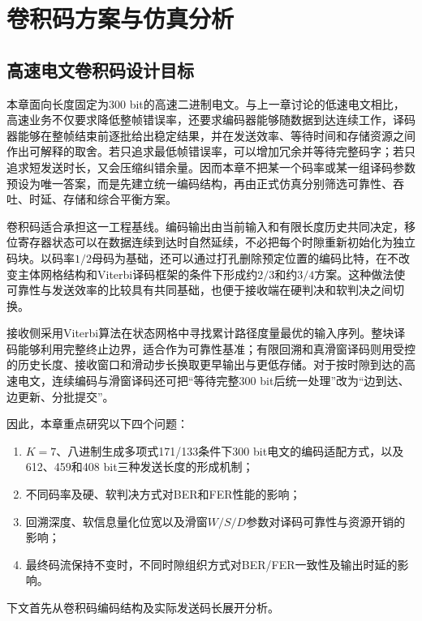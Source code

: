 \chapter{卷积码方案与仿真分析}\label{chap:cc}

\section{高速电文卷积码设计目标}

本章面向长度固定为300 bit的高速二进制电文。与上一章讨论的低速电文相比，高速业务不仅要求降低整帧错误率，还要求编码器能够随数据到达连续工作，译码器能够在整帧结束前逐批给出稳定结果，并在发送效率、等待时间和存储资源之间作出可解释的取舍。若只追求最低帧错误率，可以增加冗余并等待完整码字；若只追求短发送时长，又会压缩纠错余量。因而本章不把某一个码率或某一组译码参数预设为唯一答案，而是先建立统一编码结构，再由正式仿真分别筛选可靠性、吞吐、时延、存储和综合平衡方案。

卷积码适合承担这一工程基线。编码输出由当前输入和有限长度历史共同决定，移位寄存器状态可以在数据连续到达时自然延续，不必把每个时隙重新初始化为独立码块。以码率$1/2$母码为基础，还可以通过打孔删除预定位置的编码比特，在不改变主体网格结构和Viterbi译码框架的条件下形成约$2/3$和约$3/4$方案。这种做法使可靠性与发送效率的比较具有共同基础，也便于接收端在硬判决和软判决之间切换。

接收侧采用Viterbi算法在状态网格中寻找累计路径度量最优的输入序列。整块译码能够利用完整终止边界，适合作为可靠性基准；有限回溯和真滑窗译码则用受控的历史长度、接收窗口和滑动步长换取更早输出与更低存储。对于按时隙到达的高速电文，连续编码与滑窗译码还可把“等待完整300 bit后统一处理”改为“边到达、边更新、分批提交”。

因此，本章重点研究以下四个问题：
\begin{enumerate}
    \item $K=7$、八进制生成多项式171/133条件下300 bit电文的编码适配方式，以及612、459和408 bit三种发送长度的形成机制；
    
    \item 不同码率及硬、软判决方式对BER和FER性能的影响；
    
    \item 回溯深度、软信息量化位宽以及滑窗$W/S/D$参数对译码可靠性与资源开销的影响；
    
    \item 最终码流保持不变时，不同时隙组织方式对BER/FER一致性及输出时延的影响。
\end{enumerate}

下文首先从卷积码编码结构及实际发送码长展开分析。

